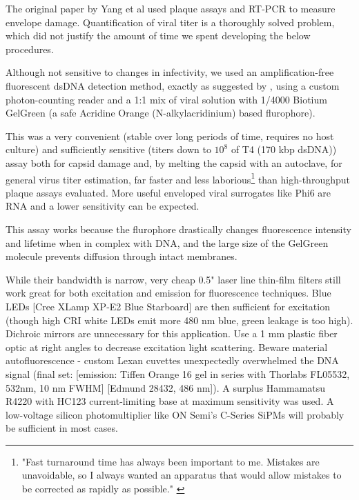 \documentclass[paper.tex]{subfiles}
\begin{document}
\begin{multicols}{1}
The original paper by Yang et al used plaque assays and RT-PCR to measure envelope damage. Quantification of viral titer is a thoroughly solved problem, which did not justify the amount of time we spent developing the below procedures.

Although not sensitive to changes in infectivity, we used an amplification-free fluorescent dsDNA detection method, exactly as suggested by \cite{Quantification2020}, using a custom photon-counting reader and a 1:1 mix of viral solution with 1/4000 Biotium GelGreen (a safe Acridine Orange (N-alkylacridinium) based flurophore). 

This was a very convenient (stable over long periods of time, requires no host culture) and sufficiently sensitive (titers down to $10^8$ of T4 (170 kbp dsDNA)) assay both for capsid damage and, by melting the capsid with an autoclave, for general virus titer estimation, far faster and less laborious\footnote{"Fast turnaround time has always been important to me. Mistakes are unavoidable, so I always wanted an apparatus that would allow mistakes to be corrected as rapidly as possible." \cite{manipulation1998}} than high-throughput plaque assays evaluated\cite{Simple2018}\cite{Streamlining2018}. More useful enveloped viral surrogates like Phi6 are RNA and a lower sensitivity can be expected.\cite{Selected} 

This assay works because the flurophore drastically changes fluorescence intensity and lifetime when in complex with DNA\cite{SYBR2012}\cite{Characterization2010}, and the large size of the GelGreen molecule prevents diffusion through intact membranes.

While their bandwidth is narrow, very cheap 0.5" laser line thin-film filters still work great for both excitation and emission for fluorescence techniques. Blue LEDs [Cree XLamp XP-E2 Blue Starboard] are then sufficient for excitation (though high CRI white LEDs emit more 480 nm blue, green leakage is too high). Dichroic mirrors are unnecessary for this application. Use a 1 mm plastic fiber optic at right angles to decrease excitation light scattering. Beware material autofluorescence - custom Lexan cuvettes unexpectedly overwhelmed the DNA signal (final set: [emission: Tiffen Orange 16 gel\cite{lide2004crc} in series with Thorlabs FL05532, 532nm, 10 nm FWHM] [Edmund 28432, 486 nm]). A surplus Hammamatsu R4220 with HC123 current-limiting base at maximum sensitivity was used. A low-voltage silicon photomultiplier like ON Semi's C-Series SiPMs will probably be sufficient in most cases.


\end{multicols}
\end{document}
